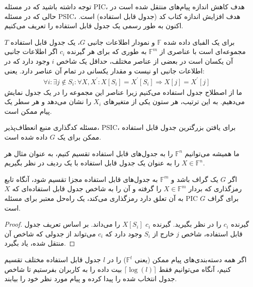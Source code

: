 \begin{مشاهده}
توجه داشته باشید که در مسئله PIC، هدف کاهش اندازه پیام‌های منتقل شده است در حالی که در مسئله PSIC، هدف افزایش اندازه کتاب کد (جدول قابل استفاده) است. اکنون به طور رسمی یک جدول قابل استفاده را تعریف می‌کنیم.
\end{مشاهده}

\begin{definition}\label{def1}
برای یک الفبای داده شده $\mathbb{F}$ و نمودار اطلاعات جانبی $G$، یک جدول قابل استفاده $T$ مجموعه‌ای است با عناصری از $\mathbb{F}^m$ به طوری که برای هر گیرنده $c_i$ اگر اطلاعات جانبی آن یکسان است در بعضی از عناصر مختلف، حداقل یک شاخص $i$ وجود دارد که در اطلاعات جانبی او نیست و مقدار یکسانی در تمام آن عناصر دارد. یعنی:
\begin{align*}
    \forall i: \exists j \notin S_i: \forall X, X^\prime: X[S_i] = {X^\prime}[S_i]  \Rightarrow X[j] = {X^\prime}[j]
\end{align*}
ما از اصطلاح جدول استفاده می‌کنیم زیرا عناصر این مجموعه را در یک جدول نمایش می‌دهیم. به این ترتیب، هر ستون یکی از متغیرهای $X_i$ را نشان می‌دهد و هر سطر یک پیام ممکن است.
\end{definition}

مسئله کدگذاری منبع انعطاف‌پذیر، PSIC، برای یافتن بزرگترین جدول قابل استفاده ممکن برای یک $G$ داده شده است.

\begin{remark}
    ما همیشه می‌توانیم $\mathbb{F}^n$ را به جدول‌های قابل استفاده تقسیم کنیم، به عنوان مثال هر $X \in \mathbb{F}^n$ را به عنوان یک جدول قابل استفاده با یک ردیف در نظر بگیریم.
\end{remark}

\begin{lemma}
    اگر $G$ یک گراف باشد و $\mathbb{F}^m$ به جدول‌های قابل استفاده مجزا تقسیم شود، آنگاه تابع رمزگذاری که بردار $X \in \mathbb{F}^m$ را گرفته و آن را به شاخص جدول قابل استفاده‌ای که $X$ به آن تعلق دارد رمزگذاری می‌کند، یک راه‌حل معتبر برای مسئله PIC برای گراف $G$ است.
\end{lemma}
\begin{proof}
    گیرنده $c_i$ را در نظر بگیرید. گیرنده $c_i$ $X[S_i]$ را می‌داند. بر اساس تعریف جدول قابل استفاده، شاخص $j$ خارج از $S_i$ وجود دارد که $c_i$ می‌تواند از جدولی که شاخص آن منتقل شده، یاد بگیرد.
\end{proof}

\begin{corollary}\label{cor1}
اگر همه دسته‌بندی‌های پیام ممکن (یعنی $\mathbb{F}^t$) را در $l$ جدول قابل استفاده مختلف تقسیم کنیم، آنگاه می‌توانیم فقط $\lceil \log(l) \rceil$ بیت داده را به کاربران بفرستیم تا شاخص جدول انتخاب شده را پیدا کرده و پیام مورد نظر خود را بیابند.
\end{corollary}

